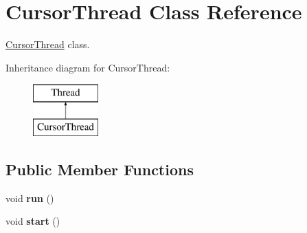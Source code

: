 \hypertarget{class_cursor_thread}{}\section{Cursor\+Thread Class Reference}
\label{class_cursor_thread}


\hyperlink{class_cursor_thread}{Cursor\+Thread} class.  


Inheritance diagram for Cursor\+Thread\+:\begin{figure}[H]
\begin{center}
\leavevmode
\includegraphics[height=2.000000cm]{class_cursor_thread}
\end{center}
\end{figure}
\subsection*{Public Member Functions}
\begin{DoxyCompactItemize}
\item 
void {\bfseries run} ()\hypertarget{class_cursor_thread_a9301a34692a1b3c3387e82f4c463fcb2}{}\label{class_cursor_thread_a9301a34692a1b3c3387e82f4c463fcb2}

\item 
void {\bfseries start} ()\hypertarget{class_cursor_thread_a4c40d058f6b9b5f95c6c68db44fb5a26}{}\label{class_cursor_thread_a4c40d058f6b9b5f95c6c68db44fb5a26}

\end{DoxyCompactItemize}
